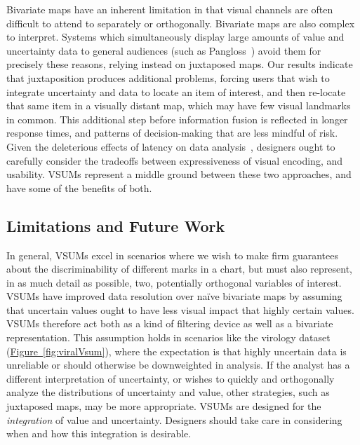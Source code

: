 \documentclass{vgtc}                          %
\newcommand{\figref}[1]{\hyperref[#1]{Figure~\ref*{#1}}}
\begin{document}
Bivariate maps have an inherent limitation in that visual channels are often difficult to attend to separately or orthogonally. Bivariate maps are also complex to interpret. Systems which simultaneously display large amounts of value and uncertainty data to general audiences (such as Pangloss~\cite{moritz2017trust}) avoid them for precisely these reasons, relying instead on juxtaposed maps. Our results indicate that juxtaposition produces additional problems, forcing users that wish to integrate uncertainty and data to locate an item of interest, and then re-locate that same item in a visually distant map, which may have few visual landmarks in common. This additional step before information fusion is reflected in longer response times, and patterns of decision-making that are less mindful of risk. Given the deleterious effects of latency on data analysis~\cite{liu2014effects}, designers ought to carefully consider the tradeoffs between expressiveness of visual encoding, and usability. VSUMs represent a middle ground between these two approaches, and have some of the benefits of both.

\subsection{Limitations and Future Work}
In general, VSUMs excel in scenarios where we wish to make firm guarantees about the discriminability of different marks in a chart, but must also represent, in as much detail as possible, two, potentially orthogonal variables of interest. VSUMs have improved data resolution over na\"ive bivariate maps by assuming that uncertain values ought to have less visual impact that highly certain values. VSUMs therefore act both as a kind of filtering device as well as a bivariate representation. This assumption holds in scenarios like the virology dataset (\figref{fig:viralVsum}), where the expectation is that highly uncertain data is unreliable or should otherwise be downweighted in analysis. If the analyst has a different interpretation of uncertainty, or wishes to quickly and orthogonally analyze the distributions of uncertainty and value, other strategies, such as juxtaposed maps, may be more appropriate. VSUMs are designed for the \emph{integration} of value and uncertainty. Designers should take care in considering when and how this integration is desirable.
\end{document}
